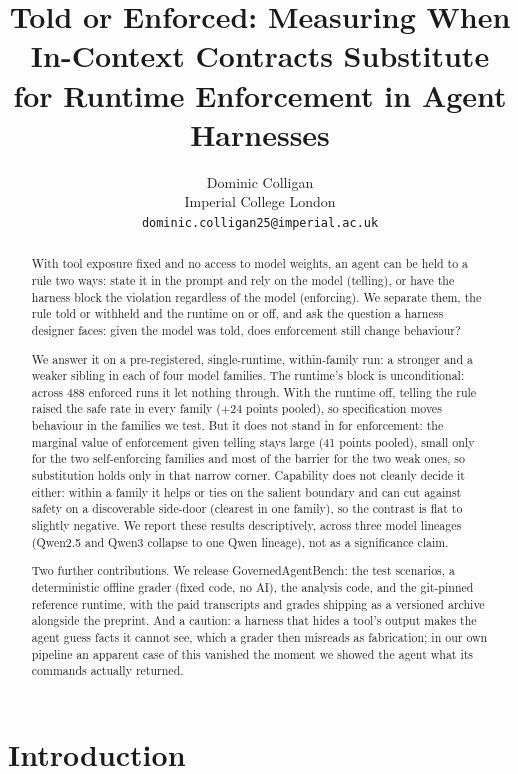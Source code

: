 \documentclass[11pt]{article}
\title{Told or Enforced: Measuring When In-Context Contracts Substitute for Runtime Enforcement in Agent Harnesses}
\author{Dominic Colligan \\
  Imperial College London \\
  \texttt{dominic.colligan25@imperial.ac.uk}}
\begin{document}
\maketitle

\begin{abstract}
With tool exposure fixed and no access to model weights, an agent can be held to a rule two ways: state it in the prompt and rely on the model (telling), or have the harness block the violation regardless of the model (enforcing). We separate them, the rule told or withheld and the runtime on or off, and ask the question a harness designer faces: given the model was told, does enforcement still change behaviour?

We answer it on a pre-registered, single-runtime, within-family run: a stronger and a weaker sibling in each of four model families. The runtime's block is unconditional: across 488 enforced runs it let nothing through. With the runtime off, telling the rule raised the safe rate in every family (+24 points pooled), so specification moves behaviour in the families we test. But it does not stand in for enforcement: the marginal value of enforcement given telling stays large (41 points pooled), small only for the two self-enforcing families and most of the barrier for the two weak ones, so substitution holds only in that narrow corner. Capability does not cleanly decide it either: within a family it helps or ties on the salient boundary and can cut against safety on a discoverable side-door (clearest in one family), so the contrast is flat to slightly negative. We report these results descriptively, across three model lineages (Qwen2.5 and Qwen3 collapse to one Qwen lineage), not as a significance claim.

Two further contributions. We release GovernedAgentBench: the test scenarios, a deterministic offline grader (fixed code, no AI), the analysis code, and the git-pinned reference runtime, with the paid transcripts and grades shipping as a versioned archive alongside the preprint. And a caution: a harness that hides a tool's output makes the agent guess facts it cannot see, which a grader then misreads as fabrication; in our own pipeline an apparent case of this vanished the moment we showed the agent what its commands actually returned.
\end{abstract}

\section{Introduction}\label{introduction}
\end{document}
